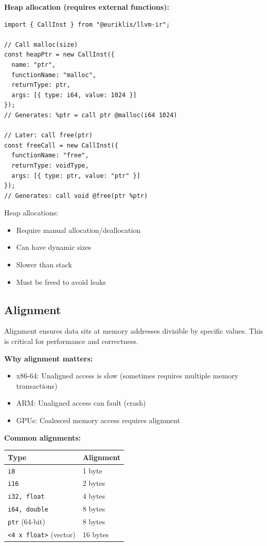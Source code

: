 \documentclass[11pt]{article}
\begin{document}
\textbf{Heap allocation (requires external functions):}
\begin{lstlisting}[style=ts]
import { CallInst } from "@euriklis/llvm-ir";

// Call malloc(size)
const heapPtr = new CallInst({
  name: "ptr",
  functionName: "malloc",
  returnType: ptr,
  args: [{ type: i64, value: 1024 }]
});
// Generates: %ptr = call ptr @malloc(i64 1024)

// Later: call free(ptr)
const freeCall = new CallInst({
  functionName: "free",
  returnType: voidType,
  args: [{ type: ptr, value: "ptr" }]
});
// Generates: call void @free(ptr %ptr)
\end{lstlisting}

Heap allocations:
\begin{itemize}[noitemsep]
  \item Require manual allocation/deallocation
  \item Can have dynamic sizes
  \item Slower than stack
  \item Must be freed to avoid leaks
\end{itemize}

\subsection{Alignment}

Alignment ensures data sits at memory addresses divisible by specific values. This is critical for performance and correctness.

\textbf{Why alignment matters:}
\begin{itemize}[noitemsep]
  \item x86-64: Unaligned access is slow (sometimes requires multiple memory transactions)
  \item ARM: Unaligned access can fault (crash)
  \item GPUs: Coalesced memory access requires alignment
\end{itemize}

\textbf{Common alignments:}
\begin{center}
\begin{tabular}{|l|l|}
\hline
\textbf{Type} & \textbf{Alignment} \\
\hline
\texttt{i8} & 1 byte \\
\texttt{i16} & 2 bytes \\
\texttt{i32, float} & 4 bytes \\
\texttt{i64, double} & 8 bytes \\
\texttt{ptr} (64-bit) & 8 bytes \\
\texttt{<4 x float>} (vector) & 16 bytes \\
\hline
\end{tabular}
\end{center}
\end{document}
